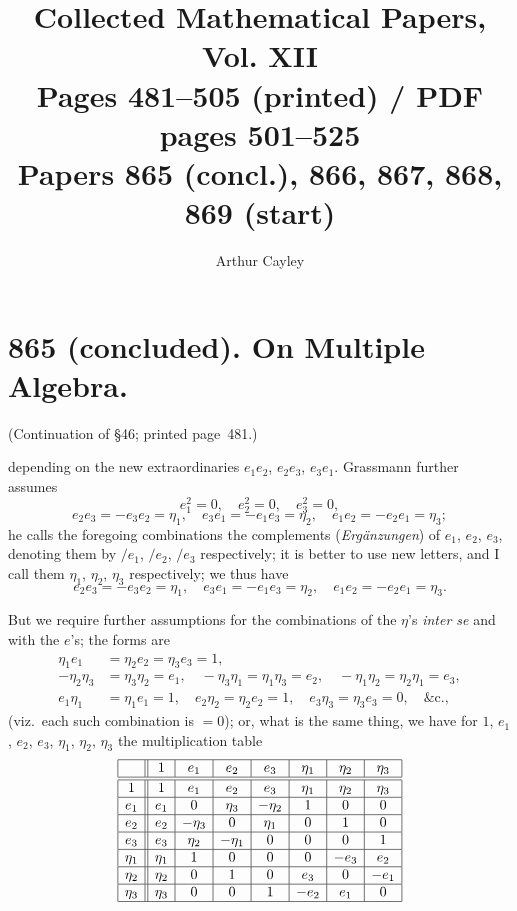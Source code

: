 \documentclass[11pt]{article}
\title{Collected Mathematical Papers, Vol. XII\\ \large Pages 481--505 (printed) / PDF pages 501--525\\ Papers 865 (concl.), 866, 867, 868, 869 (start)}
\author{Arthur Cayley}
\date{}
\begin{document}
\maketitle

\section*{865 (concluded). On Multiple Algebra.}

\noindent (Continuation of \S 46; printed page~481.)

\medskip

\noindent depending on the new extraordinaries $e_{1}e_{2}$, $e_{2}e_{3}$, $e_{3}e_{1}$. Grassmann further assumes
\[
e_{1}^{2}=0,\quad e_{2}^{2}=0,\quad e_{3}^{2}=0,
\]
\[
e_{2}e_{3}=-e_{3}e_{2}=\eta_{1},\quad e_{3}e_{1}=-e_{1}e_{3}=\eta_{2},\quad e_{1}e_{2}=-e_{2}e_{1}=\eta_{3};
\]
he calls the foregoing combinations the complements (\textit{Erg\"anzungen}) of $e_{1}$, $e_{2}$, $e_{3}$, denoting them by $/e_{1}$, $/e_{2}$, $/e_{3}$ respectively; it is better to use new letters, and I call them $\eta_{1}$, $\eta_{2}$, $\eta_{3}$ respectively; we thus have
\[
e_{2}e_{3}=-e_{3}e_{2}=\eta_{1},\quad e_{3}e_{1}=-e_{1}e_{3}=\eta_{2},\quad e_{1}e_{2}=-e_{2}e_{1}=\eta_{3}.
\]

\medskip

\noindent But we require further assumptions for the combinations of the $\eta$'s \textit{inter se} and with the $e$'s; the forms are
\begin{align*}
\eta_{1}e_{1} &= \eta_{2}e_{2} = \eta_{3}e_{3} = 1, \\
-\eta_{2}\eta_{3} &= \eta_{3}\eta_{2} = e_{1},\quad -\eta_{3}\eta_{1} = \eta_{1}\eta_{3} = e_{2},\quad -\eta_{1}\eta_{2} = \eta_{2}\eta_{1} = e_{3}, \\
e_{1}\eta_{1} &= \eta_{1}e_{1} = 1,\quad e_{2}\eta_{2} = \eta_{2}e_{2} = 1,\quad e_{3}\eta_{3} = \eta_{3}e_{3} = 0,\quad \&\mathrm{c}.,
\end{align*}
(viz.\ each such combination is $= 0$); or, what is the same thing, we have for $1$, $e_{1}$, $e_{2}$, $e_{3}$, $\eta_{1}$, $\eta_{2}$, $\eta_{3}$ the multiplication table
\[
\begin{array}{|c||c|c|c|c|c|c|c|}
\hline
 & 1 & e_{1} & e_{2} & e_{3} & \eta_{1} & \eta_{2} & \eta_{3} \\ \hline\hline
1 & 1 & e_{1} & e_{2} & e_{3} & \eta_{1} & \eta_{2} & \eta_{3} \\ \hline
e_{1} & e_{1} & 0 & \eta_{3} & -\eta_{2} & 1 & 0 & 0 \\ \hline
e_{2} & e_{2} & -\eta_{3} & 0 & \eta_{1} & 0 & 1 & 0 \\ \hline
e_{3} & e_{3} & \eta_{2} & -\eta_{1} & 0 & 0 & 0 & 1 \\ \hline
\eta_{1} & \eta_{1} & 1 & 0 & 0 & 0 & -e_{3} & e_{2} \\ \hline
\eta_{2} & \eta_{2} & 0 & 1 & 0 & e_{3} & 0 & -e_{1} \\ \hline
\eta_{3} & \eta_{3} & 0 & 0 & 1 & -e_{2} & e_{1} & 0 \\ \hline
\end{array}
\]
\end{document}
